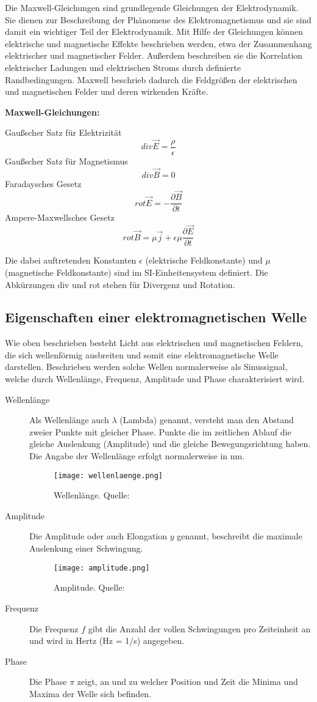 Die Maxwell-Gleichungen sind grundlegende Gleichungen der Elektrodynamik. Sie dienen zur Beschreibung der Phänomene des Elektromagnetismus und sie sind damit ein wichtiger Teil der Elektrodynamik. Mit Hilfe der Gleichungen können elektrische und magnetische Effekte beschrieben werden, etwa der Zusammenhang elektrischer und magnetischer Felder. Außerdem beschreiben sie die Korrelation elektrischer Ladungen und elektrischen Stroms durch definierte Randbedingungen. Maxwell beschrieb dadurch die Feldgrößen der elektrischen und magnetischen Felder und deren wirkenden Kräfte. 

\textbf{Maxwell-Gleichungen:}

Gaußscher Satz für Elektrizität		\[div \vec{E} = \frac{\rho}{\epsilon}\]		
Gaußscher Satz für Magnetismus 		\[div \vec{B} = 0\]
Faradaysches Gesetz					\[rot \vec{E} = -\frac{\partial\vec{B}}{\partial t}\]
Ampere-Maxwellsches Gesetz			\[rot \vec{B} = \mu\vec{j}+\epsilon\mu\frac{\partial\vec{E}}{\partial t}\]
\cite{halliday2017halliday}

Die dabei auftretenden Konstanten $\epsilon$ (elektrische Feldkonstante) und $\mu$ (magnetische Feldkonstante) sind im SI-Einheitensystem definiert. Die Abkürzungen div und rot stehen für Divergenz und Rotation. 

\subsection{Eigenschaften einer elektromagnetischen Welle}
Wie oben beschrieben besteht Licht aus elektrischen und magnetischen Feldern, die sich wellenförmig ausbreiten und somit eine elektromagnetische Welle darstellen. Beschrieben werden solche Wellen normalerweise als Sinussignal, welche durch Wellenlänge, Frequenz, Amplitude und Phase charakterisiert wird.
\begin{description}
	\item[Wellenlänge] Als Wellenlänge auch $\lambda$ (Lambda) genannt, versteht man den Abstand zweier Punkte mit gleicher Phase. Punkte die im zeitlichen Ablauf die gleiche Auslenkung (Amplitude) und die gleiche Bewegungsrichtung haben. Die Angabe der Wellenlänge erfolgt normalerweise in nm.
	\begin{figure}[ht]
		\centering
		\texttt{[image: wellenlaenge.png]}
		\caption[Wellenlänge]{Wellenlänge. Quelle: \cite{uniwien:2018}}
		\label{Wellenlänge}
	\end{figure}
	\item[Amplitude] Die Amplitude oder auch Elongation $y$ genannt, beschreibt die maximale Auslenkung einer Schwingung.
		\begin{figure}[ht]
		\centering
		\texttt{[image: amplitude.png]}
		\caption[Amplitude]{Amplitude. Quelle: \cite{uniwien:2018}}
			\label{Amplitude}
		\end{figure}
	\item[Frequenz]Die Frequenz $f$ gibt die Anzahl der vollen Schwingungen  pro Zeiteinheit an und wird in Hertz (Hz = 1/s) angegeben.
	\item[Phase] Die Phase $\pi$ zeigt, an und zu welcher Position und Zeit die Minima und Maxima der Welle sich befinden.
\end{description}


